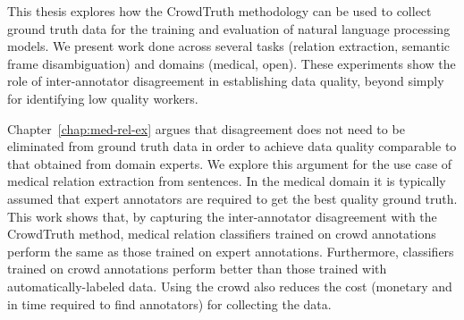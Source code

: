This thesis explores how the CrowdTruth methodology can be used to collect ground truth data for the training and evaluation of natural language processing models. We present work done across several tasks (relation extraction, semantic frame disambiguation) and domains (medical, open). These experiments show the role of inter-annotator disagreement in establishing data quality, beyond simply for identifying low quality workers.



Chapter~\ref{chap:med-rel-ex} argues that disagreement does not need to be eliminated from ground truth data in order to achieve data quality comparable to that obtained from domain experts. We explore this argument for the use case of medical relation extraction from sentences. In the medical domain it is typically assumed that expert annotators are required to get the best quality ground truth. This work shows that, by capturing the inter-annotator disagreement with the CrowdTruth method, medical relation classifiers trained on crowd annotations perform the same as those trained on expert annotations. Furthermore, classifiers trained on crowd annotations perform better than those trained with automatically-labeled data. Using the crowd also reduces the cost (monetary and in time required to find annotators) for collecting the data.

